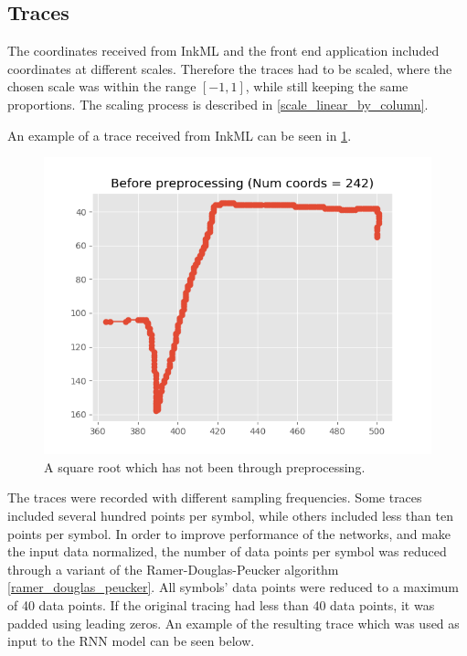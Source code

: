 \subsection{Traces}
The coordinates received from InkML and the front end application included coordinates at different scales. Therefore the traces had to be scaled, where the chosen scale was within the range $[-1, 1]$, while still keeping the same proportions. The scaling process is described in \ref{scale_linear_by_column}.

An example of a trace received from InkML can be seen in \ref{fig:sqrt_not_processed}.
\begin{figure}[H]
    \centering
    \includegraphics[width=\linewidth,keepaspectratio]{Assets/Chapter3_Method/sqrt_before_preprocessing.png}
    \caption{A square root which has not been through preprocessing.}
    \label{fig:sqrt_not_processed}
\end{figure}

The traces were recorded with different sampling frequencies. Some traces included several hundred points per symbol, while others included less than ten points per symbol. In order to improve performance of the networks, and make the input data normalized, the number of data points per symbol was reduced through a variant of the Ramer-Douglas-Peucker algorithm \ref{ramer_douglas_peucker}. All symbols' data points were reduced to a maximum of 40 data points. If the original tracing had less than 40 data points, it was padded using leading zeros. An example of the resulting trace which was used as input to the RNN model can be seen below.

